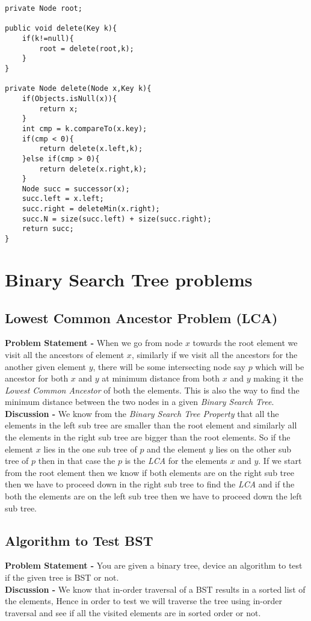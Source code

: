 \documentclass[12pt,a4paper,draft]{article}
\begin{document}
\begin{lstlisting}[caption={Delete Operation}]
private Node root;

public void delete(Key k){
	if(k!=null){
		root = delete(root,k);
	}
}

private Node delete(Node x,Key k){
	if(Objects.isNull(x)){
		return x;
	}
	int cmp = k.compareTo(x.key);
	if(cmp < 0){
		return delete(x.left,k);
	}else if(cmp > 0){
		return delete(x.right,k);
	}
	Node succ = successor(x);
	succ.left = x.left;
	succ.right = deleteMin(x.right);
	succ.N = size(succ.left) + size(succ.right);
	return succ;
}
\end{lstlisting}
\section{Binary Search Tree problems}
\subsection{Lowest Common Ancestor Problem (LCA)}
\textbf{Problem Statement -} When we go from node $x$ towards the root element we visit all the ancestors of element $x$, similarly if we visit all the ancestors for the another given element $y$, there will be some intersecting node say $p$ which will be ancestor for both $x$ and $y$ at minimum distance from both $x$ and $y$ making it the \emph{Lowest Common Ancestor} of both the elements. This is also the way to find the minimum distance between the two nodes in a given \emph{Binary Search Tree}.
\\
\textbf{Discussion -} We know from the \emph{Binary Search Tree Property} that all the elements in the left sub tree are smaller than the root element and similarly all the elements in the right sub tree are bigger than the root elements. So if the element $x$ lies in the one sub tree of $p$ and the element $y$ lies on the other sub tree of $p$ then in that case the $p$ is the \emph{LCA} for the elements $x$ and $y$. If we start from the root element then we know if both elements are on the right sub tree then we have to proceed down in the right sub tree to find the \emph{LCA} and if the both the elements are on the left sub tree then we have to proceed down the left sub tree.
\subsection{Algorithm to Test BST}
\textbf{Problem Statement -} You are given a binary tree, device an algorithm to test if the given tree is BST or not.
\\
\textbf{Discussion -} We know that in-order traversal of a BST results in a sorted list of the elements, Hence in order to test we will traverse the tree using in-order traversal and see if all the visited elements are in sorted order or not.
\end{document}
